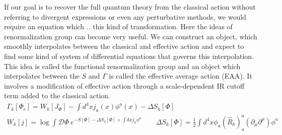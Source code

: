 \documentclass[11pt, a4paper]{article}
\begin{document}
If our goal is to recover the full quantum theory from the classical action without referring to divergent expressions or even any perturbative methods, we would require an equation which .. this kind of transformation. Here the ideas of renormalization group can become very useful. We can construct an object, which smoothly interpolates between the classical and effective action and expect to find some kind of system of differential equations that governs this interpolation. This idea is called the functional renormalization group and an object which interpolates between the $S$ and $\Gamma$ is called the effective average action (EAA).
It involves a modification of effective action through a scale-dependent IR cutoff term added to the classical action. 
\begin{gather}
    \Gamma_k[\Phi_c] = W_k[J_\Phi] - \int d^4 x j_a (x) \phi^a(x) - \Delta S_k[\Phi]\\
    W_k[j] = \log{\int \mathcal{D}\Phi \ e^{-S[\Phi] - \Delta S_k[\Phi] + \int dx j_a \phi^a}} \qquad \Delta S_k[\Phi] = \frac{1}{2}\int d^4 x \phi_a (\hat{R}_k)^a_a (\partial_{\mu}\partial^{\mu}) \phi^a
\end{gather}




 

\end{document}
